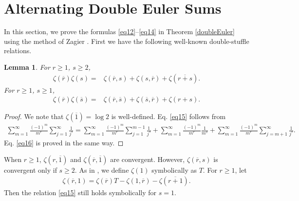 \documentclass[reqno]{amsart}
\newtheorem{lemma}[theorem]{Lemma}
\theoremstyle{definition}
\theoremstyle{remark}
\numberwithin{equation}{section}
\begin{document}
\section{Alternating Double Euler Sums}
In this section, we prove the formulas \eqref{eq12}--\eqref{eq14} in Theorem \ref{doubleEuler} using the method of Zagier \cite{1, 8}.
First we have the following well-known double-stuffle relations.
\begin{lemma}\label{lemma1}For $r\geq 1$, $s\geq 2$,
\begin{align}
\zeta(\overline{r})\zeta(s)=&\zeta(\overline{r},s)+\zeta(s, \overline{r})+\zeta(\overline{r+s}).\label{eq15}\end{align}For $r\geq 1$, $s\geq 1$,
\begin{align}
\zeta(\overline{r})\zeta(\overline{s})=&\zeta(\overline{r},\overline{s})+\zeta(\overline{s}, \overline{r})+\zeta(r+s).\label{eq16}
\end{align}
\end{lemma}
\begin{proof}We note that $\zeta(\overline{1})=\log 2$ is well-defined.
Eq. \eqref{eq15} follows from
\begin{align*}
\sum_{m=1}^{\infty}\frac{(-1)^m}{m^r}\sum_{j=1}^{\infty}\frac{1}{j^s}=\sum_{m=1}^{\infty}\frac{(-1)^m}{m^r}\sum_{j=1}^{m-1}\frac{1}{j^s}+
\sum_{m=1}^{\infty}\frac{(-1)^m}{m^r}\frac{1}{m^s}+\sum_{m=1}^{\infty}\frac{(-1)^m}{m^r}\sum_{j=m+1}^{\infty}\frac{1}{j^s}.
\end{align*} Eq. \eqref{eq16} is proved in the same way.
\end{proof}

When $r\geq 1$, $\zeta(r, \overline{1})$ and $\zeta(\overline{r}, \overline{1})$ are convergent. However, $\zeta(\overline{r}, s)$ is convergent only if $s\geq 2$. As in \cite{1}, we define $\zeta(1)$ symbolically as $T$. For $r\geq 1$, let
\begin{align*}
\zeta(\overline{r}, 1)=\zeta(\overline{r})T-\zeta(1,\overline{r})-\zeta(\overline{r+1}).
\end{align*}Then the relation \eqref{eq15} still holds symbolically for $s=1$.
\end{document}
